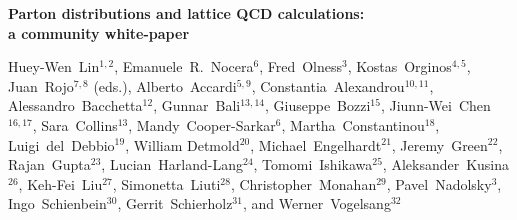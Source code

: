 \documentclass[11pt,a4paper]{article}
\numberwithin{equation}{section}
\numberwithin{figure}{section}
\numberwithin{table}{section}
\begin{document}
\vspace{.3cm}

\begin{center}
{\Large \bf Parton distributions and lattice QCD calculations:\\[0.2cm] a community white-paper}
\vspace{.4cm}

{\small 
  Huey-Wen~Lin$^{1,2}$,
  Emanuele~R.~Nocera$^6$,
  Fred~Olness$^3$,
  Kostas~Orginos$^{4,5}$,
  Juan~Rojo$^{7,8}$ (eds.),
Alberto~Accardi$^{5,9}$, 
Constantia~Alexandrou$^{10,11}$, 
Alessandro~Bacchetta$^{12}$, 
Gunnar~Bali$^{13,14}$, 
Giuseppe~Bozzi$^{15}$, 
Jiunn-Wei~Chen$^{16,17}$, 	
Sara~Collins$^{13}$, 	
Mandy~Cooper-Sarkar$^{6}$, 
Martha~Constantinou$^{18}$, 
Luigi~del~Debbio$^{19}$, 
William Detmold$^{20}$, 
Michael~Engelhardt$^{21}$, 
Jeremy~Green$^{22}$, 
Rajan~Gupta$^{23}$, 
Lucian~Harland-Lang$^{24}$, 
Tomomi~Ishikawa$^{25}$, 
Aleksander~Kusina$^{26}$, 
Keh-Fei~Liu$^{27}$, 	
Simonetta~Liuti$^{28}$, 		
Christopher~Monahan$^{29}$, 		
Pavel~Nadolsky$^{3}$, 
Ingo~Schienbein$^{30}$, 	
Gerrit~Schierholz$^{31}$, and
Werner~Vogelsang$^{32}$
}


\end{center}
\end{document}
